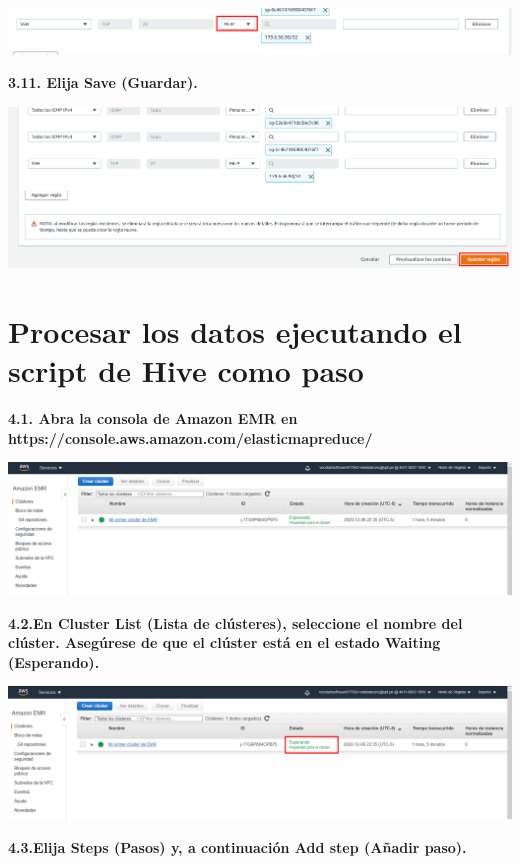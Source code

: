 \documentclass{article}
\begin{document}
    \begin{center}
		\includegraphics[width=15cm]{./images/19} 
	\end{center}


\textbf{3.11. Elija Save (Guardar).
}

    \begin{center}
		\includegraphics[width=15cm]{./images/20} 
	\end{center}
\newpage

\section{Procesar los datos ejecutando el script de Hive como paso }

\textbf{4.1. Abra la consola de Amazon EMR en https://console.aws.amazon.com/elasticmapreduce/ }

    \begin{center}
		\includegraphics[width=15cm]{./images/21} 
	\end{center}
\textbf{4.2.En Cluster List (Lista de clústeres), seleccione el nombre del clúster. Asegúrese de que el clúster está en
el estado Waiting (Esperando).  }

    \begin{center}
		\includegraphics[width=15cm]{./images/22} 
	\end{center}
	\newpage
\textbf{4.3.Elija Steps (Pasos) y, a continuación Add step (Añadir paso). 
}
\end{document}
